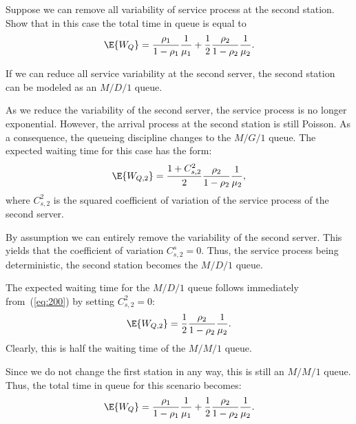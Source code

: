 \begin{exercise}
Suppose we can remove all variability of  service process at the second station. Show that  in this case  the total time in queue is equal to
\begin{equation*}
  \E{W_Q}= \frac{\rho_1}{1-\rho_1} \frac1{\mu_1} +
  \frac12\frac{\rho_2}{1-\rho_2} \frac1{\mu_2}.
\end{equation*}
\begin{hint}
  If we can reduce all service variability at the second server, the second station can be modeled as an $M/D/1$ queue.
\end{hint}
\begin{solution}
As we reduce the variability of the second server, the service process
is no longer exponential. However, the arrival process at the second
station is still Poisson. As a consequence, the queueing discipline
changes to the $M/G/1$ queue. The expected waiting time for this case
has the form:
\begin{equation}\label{eq:200}
\E{W_{Q,2}} = \frac{1+C_{s,2}^2}2\frac{\rho_2}{1-\rho_2} \frac1{\mu_2},
\end{equation}
where $C_{s,2}^2$ is the squared coefficient of variation of the
service process of the second server.

By assumption we can entirely remove the variability of the second
server.  This yields that the coefficient of variation
$C_{s,2}^s = 0$. Thus, the service process being deterministic, the
second station becomes the $M/D/1$ queue.

The expected waiting time for the $M/D/1$ queue follows immediately
from~(\ref{eq:200}) by setting $C_{s,2}^2 =0$:
\begin{equation}\label{eq:300}
\E{W_{Q,2}} = \frac{1}2\frac{\rho_2}{1-\rho_2} \frac1{\mu_2}.
\end{equation}
Clearly, this is half the waiting time of the  $M/M/1$ queue. 

Since we do not change the first station in any way, this is still an
$M/M/1$ queue. 
Thus, the total time in queue for this scenario becomes:
\begin{equation*}
  \E{W_Q}= \frac{\rho_1}{1-\rho_1} \frac1{\mu_1} +
  \frac12\frac{\rho_2}{1-\rho_2} \frac1{\mu_2}. 
\end{equation*}
\end{solution}
\end{exercise}


